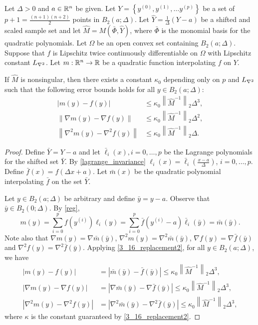 \documentclass{article}
\newcommand{\real}{\mathbb R}
\begin{document}
\begin{corollary}  \label{error_bounds_shifted}
Let  $\Delta>0$ and $a \in \mathbb R^n$ be given.  Let $Y = \left\{y^{(0)}, y^{(1)}, \ldots y^{(p)} \right\}$ be a set of $p+1=\frac{(n+1)(n+2)}{2}$ points in $B_2\left(a;\Delta\right)$.    Let  $\hat{Y}=\frac{1}{\Delta} \left(Y-a\right)$ be a shifted and scaled sample set and let $\hat{M} = M(\bar \Phi,\hat{Y})$, where $\bar \Phi$ is the monomial basis for  the quadratic polynomials.  Let $\Omega$ be an open convex set containing $B_2(a;\Delta)$.
Suppose that $f$ is Lipschitz twice continuously differentiable on $\Omega$ with Lipschitz constant ${L_{\nabla^2}}$.
Let $m: \Rn \rightarrow \real$ be a quadratic function interpolating $f$ on $Y$.

If $\hat{M}$ is nonsingular, then there exists a constant $\kappa_0$ depending only on $p$ and ${L_{\nabla^2}}$ such that the following error bounds holds for all $y \in B_2\left(a; \Delta\right)$:
\begin{align}
\left|m(y) - f(y)\right| &\le \kappa_0 \left\|\hat M^{-1}\right\|_2 \Delta^3,  \\
\left\|\nabla m(y) - \nabla f(y)\right\| &\le \kappa_0 \left\|\hat M^{-1} \right\|_2\Delta^2, \\
\left\|\nabla^2 m(y) - \nabla^2 f(y)\right\| &\le \kappa_0 \left\|\hat M^{-1} \right\|_2\Delta. 
\end{align}

\end{corollary}
\begin{proof}
Define $\bar{Y}=Y-a$ and let $\bar{\ell}_i(x), i=0,\dots,p$ be the Lagrange polynomials for the shifted set $\bar{Y}$.  By \cref{lagrange_invariance} $\ell_i(x) = \bar{\ell}_i\left(\frac{x-a}{\Delta}\right)$, $i=0,\ldots,p$.  Define $\bar{f}(x)= f(\Delta x + a)$.   Let $\bar{m}(x)$ be the quadratic polynomial interpolating $\bar{f}$ on the set $\bar{Y}$.   

Let $y \in B_2(a;\Delta)$ be arbitrary and define $\bar{y} =y-a$.  Observe that $\bar{y}  \in B_2(0;\Delta)$.    By \cref{reg},
\[ m(y)=\sum_{i=0}^p f(y^{(i)}) \ell_i(y) = \sum_{i=0}^p \bar{f}(y^{(i)}-a) \bar{\ell}_i(\bar{y})=\bar{m}(\bar{y}).\]
Note also that $\nabla m(y)=\nabla \bar{m}(\bar{y})$, $\nabla^2 m(y)=\nabla^2 \bar{m}(\bar{y})$, $\nabla f(y)=\nabla \bar{f}(\bar{y})$ and $\nabla^2 f(y)=\nabla^2 \bar{f}(\bar{y})$.  
Applying \cref{3_16_replacement2}, for all $y \in B_2(a;\Delta)$, we have
\begin{align}
|m(y)-f(y)| & = |\bar{m}(\bar{y})-\bar{f}(\bar{y})| \le \kappa_0 \left\| \hat{M}^{-1} \right\|_2 \Delta^3, \\
|\nabla m(y)-\nabla f(y)| & = |\nabla \bar{m}(\bar{y})-\nabla \bar{f}(\bar{y})| \le \kappa_0 \left\| \hat{M}^{-1} \right\|_2 \Delta^3, \\
|\nabla^2 m(y)-\nabla^2 f(y)| & = |\nabla^2 \bar{m}(\bar{y})- \nabla^2 \bar{f}(\bar{y})| \le \kappa_0 \left\| \hat{M}^{-1} \right\|_2 \Delta^3, 
\end{align}
where $\kappa$ is the constant guaranteed by \cref{3_16_replacement2}.
\end{proof}
\end{document}
